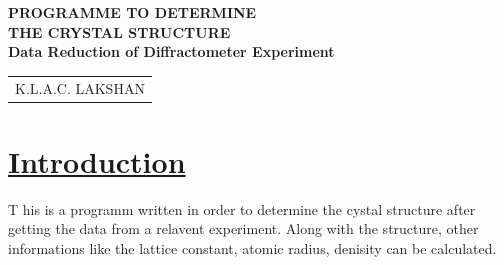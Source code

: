 \documentclass[a4paper]{article}
\begin{document}
\begin{titlepage}




\begin{addmargin}[1em]{1em}
\begin{center}
\begin{flushleft}
\end{flushleft}

\vspace{5cm} 
\textbf{\Huge PROGRAMME TO DETERMINE}\\[0.3cm]
\textbf{\Huge THE CRYSTAL STRUCTURE}\\[1cm]
\textbf{\Large Data Reduction of Diffractometer Experiment}\\[15cm]

\begin{minipage}{0.8\textwidth}
\begin{flushright} \large
\begin{tabular}{@{}l@{}}
K.L.A.C. LAKSHAN \\
\end{tabular}
\end{flushright}
\end{minipage}
\end{center}
\end{addmargin}
\end{titlepage}





\newpage

\tableofcontents
\newpage

\section{\underline{Introduction}}
\vspace{1em}
\lettrine{T}{} his is a programm written in order to determine the cystal structure after getting the data from a relavent experiment. 
Along with the structure, other informations like the lattice constant, atomic radius, denisity can be calculated.
\end{document}
